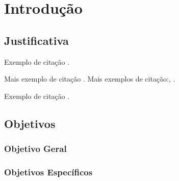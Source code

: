 \chapter{Introdução}
 
\blindtext 

\section{Justificativa}
\blindtext Exemplo de citação \cite{SCHAERF1995}.

\blindtext Mais exemplo de citação \cite{GLOVER1997}.
\blindtext Mais exemplos de citação:\cite{CESCHIA2011}, \cite{ELLOUMI2008}.

\blindtext Exemplo de citação \cite{SOUZA2004}.	

\section{Objetivos}
\subsection{Objetivo Geral}	
\blindtext
\subsection{Objetivos Específicos}	
\blinditemize[3]

